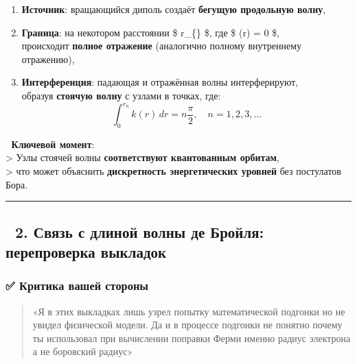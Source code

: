 \documentclass[11pt]{article}
\providecommand{\tightlist}{%
      \setlength{\itemsep}{0pt}\setlength{\parskip}{0pt}}
\begin{document}
\begin{enumerate}
\def\labelenumi{\arabic{enumi}.}
\tightlist
\item
  \textbf{Источник}: вращающийся диполь создаёт \textbf{бегущую
  продольную волну},
\item
  \textbf{Граница}: на некотором расстоянии \$ r\_\{\} \$,
  где \$ (r) = 0 \$,\\
  происходит \textbf{полное отражение} (аналогично полному внутреннему
  отражению),
\item
  \textbf{Интерференция}: падающая и отражённая волны интерферируют,\\
  образуя \textbf{стоячую волну} с узлами в точках, где: \[
     \int_0^{r_n} k(r) \, dr = n \frac{\pi}{2}, \quad n = 1, 2, 3, \dots
     \]
\end{enumerate}

📌 \textbf{Ключевой момент}:\\
\textgreater{} Узлы стоячей волны \textbf{соответствуют квантованным
орбитам},\\
\textgreater{} что может объяснить \textbf{дискретность энергетических
уровней} без постулатов Бора.

\begin{center}\rule{0.5\linewidth}{\linethickness}\end{center}

\subsection{🔹 2. Связь с длиной волны де Бройля: перепроверка
выкладок}\label{ux441ux432ux44fux437ux44c-ux441-ux434ux43bux438ux43dux43eux439-ux432ux43eux43bux43dux44b-ux434ux435-ux431ux440ux43eux439ux43bux44f-ux43fux435ux440ux435ux43fux440ux43eux432ux435ux440ux43aux430-ux432ux44bux43aux43bux430ux434ux43eux43a}

\subsubsection{✅ Критика вашей
стороны}\label{ux43aux440ux438ux442ux438ux43aux430-ux432ux430ux448ux435ux439-ux441ux442ux43eux440ux43eux43dux44b}

\begin{quote}
«Я в этих выкладках лишь узрел попытку математической подгонки но не
увидел физической модели. Да и в процессе подгонки не понятно почему ты
использовал при вычислении поправки Ферми именно радиус электрона а не
боровский радиус»
\end{quote}
\end{document}
